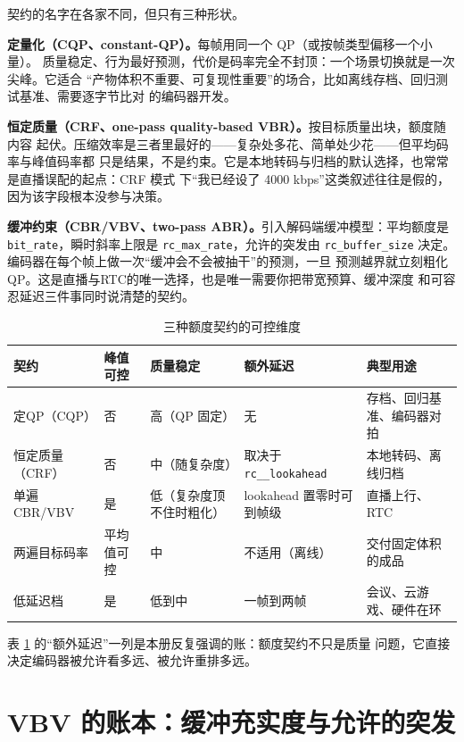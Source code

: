 \documentclass[12pt,a4paper,fontset=fandol]{ctexbook}
\newcommand{\Tp}[1]{\texttt{#1}}
\newcommand{\Bk}{\discretionary{}{}{}}
\begin{document}
契约的名字在各家不同，但只有三种形状。

\textbf{定量化（CQP、constant-QP）。}每帧用同一个 QP（或按帧类型偏移一个小量）。
质量稳定、行为最好预测，代价是码率完全不封顶：一个场景切换就是一次尖峰。它适合
``产物体积不重要、可复现性重要''的场合，比如离线存档、回归测试基准、需要逐字节比对
的编码器开发。

\textbf{恒定质量（CRF、one-pass quality-based VBR）。}按目标质量出块，额度随内容
起伏。压缩效率是三者里最好的——复杂处多花、简单处少花——但平均码率与峰值码率都
只是结果，不是约束。它是本地转码与归档的默认选择，也常常是直播误配的起点：CRF 模式
下``我已经设了 4000 kbps''这类叙述往往是假的，因为该字段根本没参与决策。

\textbf{缓冲约束（CBR/VBV、two-pass ABR）。}引入解码端缓冲模型：平均额度是
\Tp{bit\_rate}，瞬时斜率上限是 \Tp{rc\_max\_rate}，允许的突发由
\Tp{rc\_buffer\_size} 决定。编码器在每个帧上做一次``缓冲会不会被抽干''的预测，一旦
预测越界就立刻粗化 QP。这是直播与RTC的唯一选择，也是唯一需要你把带宽预算、缓冲深度
和可容忍延迟三件事同时说清楚的契约。

\begin{longtable}{@{}>{\raggedright\arraybackslash\footnotesize}p{} >{\raggedright\arraybackslash\footnotesize}p{} >{\raggedright\arraybackslash\footnotesize}p{} >{\raggedright\arraybackslash\footnotesize}p{} >{\raggedright\arraybackslash\footnotesize}p{}@{}}
\caption{三种额度契约的可控维度}\label{tab:ch07-contract} \\
\toprule
契约 & 峰值可控 & 质量稳定 & 额外延迟 & 典型用途 \\
\midrule
\endfirsthead
定QP（CQP） & 否 & 高（QP 固定） & 无 & 存档、回归基准、编码器对拍 \\
恒定质量（CRF） & 否 & 中（随复杂度） & 取决于 \Tp{rc\Bk\_\_lookahead} & 本地转码、离线归档 \\
单遍 CBR/VBV & 是 & 低（复杂度顶不住时粗化） &  lookahead 置零时可到帧级 & 直播上行、RTC \\
两遍目标码率 & 平均值可控 & 中 & 不适用（离线） & 交付固定体积的成品 \\
低延迟档 & 是 & 低到中 & 一帧到两帧 & 会议、云游戏、硬件在环 \\
\bottomrule
\end{longtable}

表 \ref{tab:ch07-contract} 的``额外延迟''一列是本册反复强调的账：额度契约不只是质量
问题，它直接决定编码器被允许看多远、被允许重排多远。

\section{VBV 的账本：缓冲充实度与允许的突发}
\end{document}
